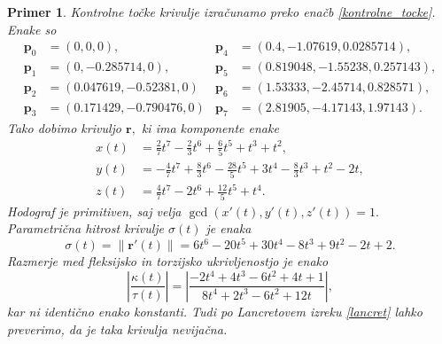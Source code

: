 \documentclass[12pt,a4paper,twoside]{article}
\theoremstyle{definition} %
\theoremstyle{plain} %
\theoremstyle{primerstyle}
\newtheorem{primer}[definicija]{Primer}
\numberwithin{equation}{section}  %
\newcommand{\pV}{\mathbf{p}}
\newcommand{\rV}{\mathbf{r}}
\begin{document}
\begin{primer}
	Kontrolne točke krivulje izračunamo preko enačb \eqref{kontrolne_tocke}. Enake so
	\begin{align*}
		\pV_0&=(0,0,0),&\pV_4&=(0.4, -1.07619, 0.0285714),\\
		\pV_1&=(0, -0.285714, 0),&\pV_5&=(0.819048, -1.55238, 0.257143),\\
		\pV_2&=(0.047619, -0.52381, 0)&\pV_6&=(1.53333, -2.45714, 0.828571),\\
		\pV_3&=(0.171429, -0.790476, 0)&\pV_7&=(2.81905, -4.17143, 1.97143).
	\end{align*}
	Tako dobimo krivuljo $\rV,$ ki ima komponente enake
	\begin{align*}
		x(t)&=\frac{2}{7}t^7-\frac{2}{3}t^6+\frac{6}{5}t^5+t^3+t^2,\\
		y(t)&=-\frac{4}{7}t^7+\frac{8}{3}t^6-\frac{28}{5}t^5+3t^4-\frac{8}{3}t^3+t^2-2t,\\
		z(t)&=\frac{4}{7}t^7-2t^6+\frac{12}{5}t^5+t^4.
	\end{align*}
	Hodograf je primitiven, saj velja $\gcd(x'(t),y'(t),z'(t))=1.$ Parametrična hitrost krivulje $\sigma(t)$ je enaka
	\begin{equation*}
		\sigma(t)=\lVert\rV'(t)\rVert=6t^6-20t^5+30t^4-8t^3+9t^2-2t+2.
	\end{equation*}
	Razmerje med fleksijsko in torzijsko ukrivljenostjo je enako
	\begin{equation*}
		\left|\frac{\kappa(t)}{\tau(t)}\right|=\left|\frac{-2t^4+4t^3-6t^2+4t+1}{8t^4+2t^3-6t^2+12t}\right|,
	\end{equation*}
	kar ni identično enako konstanti. Tudi po Lancretovem izreku \ref{lancret} lahko preverimo, da je taka krivulja nevijačna.
\end{primer}

\end{document}

